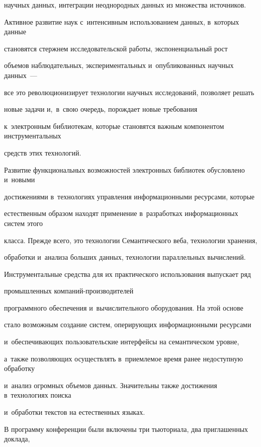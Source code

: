 научных данных, интеграции неоднородных данных из множества источников.


Активное развитие наук с~интенсивным использованием данных, в~которых данные


становятся стержнем исследовательской работы, экспоненциальный рост


объемов наблюдательных, экспериментальных и~опубликованных научных данных~---


все это революционизирует технологии научных исследований, позволяет решать


новые задачи и,~в~свою очередь, порождает новые требования


к~электронным библиотекам, которые становятся важным компонентом инструментальных


средств этих технологий.





Развитие функциональных возможностей электронных библиотек обуслов\-ле\-но и~новыми


достижениями в~технологиях управления информационными ресурсами, которые


естественным образом находят применение в~разработках информационных систем этого


класса. Прежде всего, это технологии Семантического веба, технологии хранения,


обработки и~анализа больших данных, технологии параллельных вычислений.


Инструментальные средства для их практического использования выпускает ряд


промышленных ком\-па\-ний-про\-из\-во\-ди\-те\-лей


программного обеспечения и~вычислительного оборудования. На этой основе


стало возможным создание систем, оперирующих информационными ресурсами


и~обеспечивающих пользовательские интерфейсы на семантическом уровне,


а~так\-же позволяющих осуществлять в~приемлемое время ранее недоступную обработку


и~анализ огромных объемов данных. Значительны также достижения в~технологиях поиска


и~обработки текстов на естественных языках.





В программу конференции были включены три тьюториала, два приглашенных доклада,


